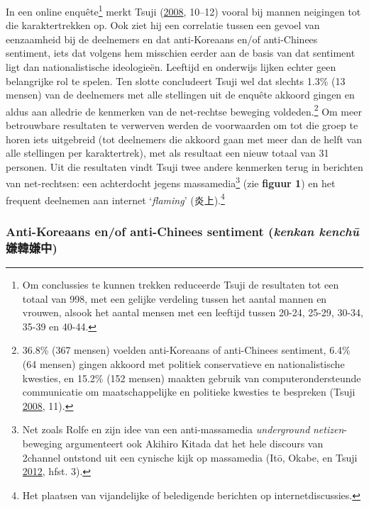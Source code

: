 \documentclass[10.5pt,dutch,]{article}
\begin{document}
In een online enquête\footnote{Om conclussies te kunnen trekken
  reduceerde Tsuji de resultaten tot een totaal van 998, met een gelijke
  verdeling tussen het aantal mannen en vrouwen, alsook het aantal
  mensen met een leeftijd tussen 20-24, 25-29, 30-34, 35-39 en 40-44.}
merkt Tsuji (\protect\hyperlink{ref-tsujiux5fintanettoux5f2008}{2008},
10--12) vooral bij mannen neigingen tot die karaktertrekken op. Ook ziet
hij een correlatie tussen een gevoel van eenzaamheid bij de deelnemers
en dat anti-Koreaans en/of anti-Chinees sentiment, iets dat volgens hem
misschien eerder aan de basis van dat sentiment ligt dan
nationalistische ideologieën. Leeftijd en onderwijs lijken echter geen
belangrijke rol te spelen. Ten slotte concludeert Tsuji wel dat slechts
1.3\% (13 mensen) van de deelnemers met alle stellingen uit de enquête
akkoord gingen en aldus aan alledrie de kenmerken van de net-rechtse
beweging voldeden.\footnote{36.8\% (367 mensen) voelden anti-Koreaans of
  anti-Chinees sentiment, 6.4\% (64 mensen) gingen akkoord met politiek
  conservatieve en nationalistische kwesties, en 15.2\% (152 mensen)
  maakten gebruik van computerondersteunde communicatie om
  maatschappelijke en politieke kwesties te bespreken (Tsuji
  \protect\hyperlink{ref-tsujiux5fintanettoux5f2008}{2008}, 11).} Om
meer betrouwbare resultaten te verwerven werden de voorwaarden om tot
die groep te horen iets uitgebreid (tot deelnemers die akkoord gaan met
meer dan de helft van alle stellingen per karaktertrek), met als
resultaat een nieuw totaal van 31 personen. Uit die resultaten vindt
Tsuji twee andere kenmerken terug in berichten van net-rechtsen: een
achterdocht jegens massamedia\footnote{Net zoals Rolfe en zijn idee van
  een anti-massamedia \emph{underground} \emph{netizen}-beweging
  argumenteert ook Akihiro Kitada dat het hele discours van 2channel
  ontstond uit een cynische kijk op massamedia (Itō, Okabe, en Tsuji
  \protect\hyperlink{ref-itoux5ffandomux5f2012}{2012}, hfst. 3).} (zie
\textbf{figuur 1}) en het frequent deelnemen aan internet
`\emph{flaming}' (炎上).\footnote{Het plaatsen van vijandelijke of
  beledigende berichten op internetdiscussies.}

\subsubsection{\texorpdfstring{Anti-Koreaans en/of anti-Chinees
sentiment (\emph{kenkan kenchū}
嫌韓嫌中)}{Anti-Koreaans en/of anti-Chinees sentiment (kenkan kenchū 嫌韓嫌中)}}\label{anti-koreaans-enof-anti-chinees-sentiment-kenkan-kenchux16b-ux5accux97d3ux5accux4e2d}
\end{document}
